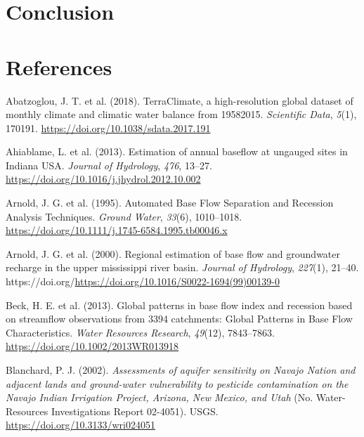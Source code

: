 \documentclass[
]{agujournal2019}
\newlength{\cslhangindent}
\newenvironment{CSLReferences}[2] %
 {\begin{list}{}{%
  \setlength{\itemindent}{0pt}
  \setlength{\leftmargin}{0pt}
  \setlength{\parsep}{0pt}
  \ifodd #1
   \setlength{\leftmargin}{\cslhangindent}
   \setlength{\itemindent}{-1\cslhangindent}
  \fi
  \setlength{\itemsep}{#2\baselineskip}}}
 {\end{list}}
\begin{document}
\section{Conclusion}\label{sec-conclusion}

\section*{References}\label{references}

\label{refs}
\begin{CSLReferences}{1}{0}
\vspace{1em}

Abatzoglou, J. T. et al. (2018). TerraClimate, a high-resolution global
dataset of monthly climate and climatic water balance from
1958{\textendash}2015. \emph{Scientific Data}, \emph{5}(1), 170191.
\url{https://doi.org/10.1038/sdata.2017.191}

Ahiablame, L. et al. (2013). Estimation of annual baseflow at ungauged
sites in Indiana USA. \emph{Journal of Hydrology}, \emph{476}, 13--27.
\url{https://doi.org/10.1016/j.jhydrol.2012.10.002}

Arnold, J. G. et al. (1995). Automated Base Flow Separation and
Recession Analysis Techniques. \emph{Ground Water}, \emph{33}(6),
1010--1018. \url{https://doi.org/10.1111/j.1745-6584.1995.tb00046.x}

Arnold, J. G. et al. (2000). Regional estimation of base flow and
groundwater recharge in the upper mississippi river basin. \emph{Journal
of Hydrology}, \emph{227}(1), 21--40.
https://doi.org/\url{https://doi.org/10.1016/S0022-1694(99)00139-0}

Beck, H. E. et al. (2013). Global patterns in base flow index and
recession based on streamflow observations from 3394 catchments: Global
Patterns in Base Flow Characteristics. \emph{Water Resources Research},
\emph{49}(12), 7843--7863. \url{https://doi.org/10.1002/2013WR013918}

Blanchard, P. J. (2002). \emph{Assessments of aquifer sensitivity on
{Navajo Nation} and adjacent lands and ground-water vulnerability to
pesticide contamination on the {Navajo Indian Irrigation Project},
{Arizona}, {New Mexico}, and {Utah}} (No. Water-Resources Investigations
Report 02-4051). {USGS}. \url{https://doi.org/10.3133/wri024051}


\end{CSLReferences}
\end{document}
